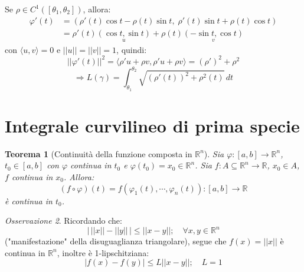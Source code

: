 \documentclass[11pt, a4paper, openright]{book}
\theoremstyle{plain}
\newtheorem{teorema}{Teorema}[section]
\theoremstyle{definition}
\theoremstyle{remark}
\newtheorem{osservazione}[teorema]{Osservazione}
\newcommand{\innerprod}[2]{\langle #1, #2 \rangle}
\begin{document}
Se $\rho \in C^1([\theta_1, \theta_2])$, allora:
\begin{equation}
    \begin{aligned}
        \varphi'(t) &= (\rho'(t)\cos t - \rho(t)\sin t, \; \rho'(t)\sin t + \rho(t)\cos t) \\
        &= \rho'(t)\underset{u}{(\cos t, \sin t)} + \rho(t)\underset{v}{(-\sin t, \cos t)}
    \end{aligned}
\end{equation}
con $\innerprod{u}{v} = 0$ e $||u|| = ||v|| = 1$, quindi:
\begin{equation}
    ||\varphi'(t)||^2 = \innerprod{\rho' u + \rho v}{\rho' u + \rho v} = (\rho')^2 + \rho^2
\end{equation}
\begin{equation}
    \Longrightarrow L(\gamma) = \int_{\theta_1}^{\theta_2} \sqrt{(\rho'(t))^2 + \rho^2(t)} \, dt
\end{equation}

\section{Integrale curvilineo di prima specie}
\begin{teorema}[Continuità della funzione composta in $\mathbb{R}^n$]
    Sia $\varphi: [a, b] \longrightarrow \mathbb{R}^n$, $t_0 \in [a, b]$ con $\varphi$ continua in $t_0$ e $\varphi(t_0) = x_0 \in \mathbb{R}^n$. Sia $f: A \subseteq \mathbb{R}^n \longrightarrow \mathbb{R}$, $x_0 \in A$, $f$ continua in $x_0$. Allora:
    \begin{equation}
        (f \circ \varphi)(t) = f(\varphi_1(t), \cdots, \varphi_n(t)): [a, b] \longrightarrow \mathbb{R}
    \end{equation}
    è continua in $t_0$.
\end{teorema}

\begin{osservazione}
    Ricordando che:
    \begin{equation}
        \left|\, ||x|| - ||y|| \,\right| \leq ||x - y||; \quad \forall x, y \in \mathbb{R}^n
    \end{equation}
    ("manifestazione" della disuguaglianza triangolare), segue che $f(x) = ||x||$ è continua in $\mathbb{R}^n$, inoltre è 1-lipschitziana:
    \begin{equation}
        |f(x) - f(y)| \leq L||x - y||; \quad L = 1
    \end{equation}
\end{osservazione}
\end{document}
